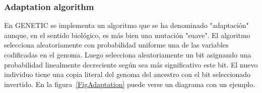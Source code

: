 \documentclass[review,authoryear]{elsarticle}
\newcommand{\PSPICTURE}[7]
{
	\begin{figure}[ht!]
		\centering
		\pspicture(#1,#2)(#3,#4)
			#5
		\endpspicture
		\caption{#6.\label{#7}}
	\end{figure}
}
\begin{document}
\subsubsection{Adaptation algorithm}

En GENETIC se implementa un algoritmo que se ha denominado "adaptación" aunque,
en el sentido biológico, es más bien una mutación "suave". El algoritmo
selecciona aleatoriamente con probabilidad uniforme una de las variables
codificadas en el genoma. Luego selecciona aleatoriamente un bit asignando una
probabilidad linealmente decreciente según sea más significativo este bit. El
nuevo individuo tiene una copia literal del genoma del ancestro con el bit
seleccionado invertido. En la figura~\ref{FigAdaptation} puede verse un diagrama
con un ejemplo.

\end{document}
